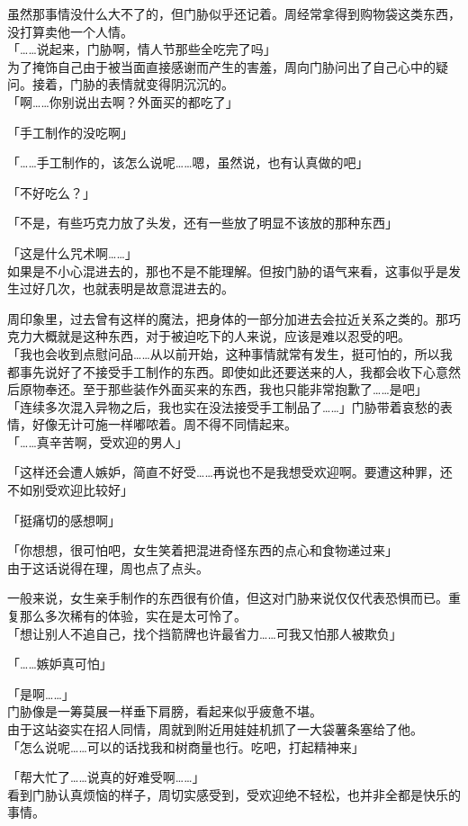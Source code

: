 虽然那事情没什么大不了的，但门胁似乎还记着。周经常拿得到购物袋这类东西，没打算卖他一个人情。\\

「……说起来，门胁啊，情人节那些全吃完了吗」\\

为了掩饰自己由于被当面直接感谢而产生的害羞，周向门胁问出了自己心中的疑问。接着，门胁的表情就变得阴沉沉的。\\

「啊……你别说出去啊？外面买的都吃了」

「手工制作的没吃啊」

「……手工制作的，该怎么说呢……嗯，虽然说，也有认真做的吧」

「不好吃么？」

「不是，有些巧克力放了头发，还有一些放了明显不该放的那种东西」

「这是什么咒术啊……」\\

如果是不小心混进去的，那也不是不能理解。但按门胁的语气来看，这事似乎是发生过好几次，也就表明是故意混进去的。

周印象里，过去曾有这样的魔法，把身体的一部分加进去会拉近关系之类的。那巧克力大概就是这种东西，对于被迫吃下的人来说，应该是难以忍受的吧。\\

「我也会收到点慰问品……从以前开始，这种事情就常有发生，挺可怕的，所以我都事先说好了不接受手工制作的东西。即使如此还要送来的人，我都会收下心意然后原物奉还。至于那些装作外面买来的东西，我也只能非常抱歉了……是吧」\\

「连续多次混入异物之后，我也实在没法接受手工制品了……」门胁带着哀愁的表情，好像无计可施一样嘟哝着。周不得不同情起来。\\

「……真辛苦啊，受欢迎的男人」

「这样还会遭人嫉妒，简直不好受……再说也不是我想受欢迎啊。要遭这种罪，还不如别受欢迎比较好」

「挺痛切的感想啊」

「你想想，很可怕吧，女生笑着把混进奇怪东西的点心和食物递过来」\\

由于这话说得在理，周也点了点头。

一般来说，女生亲手制作的东西很有价值，但这对门胁来说仅仅代表恐惧而已。重复那么多次稀有的体验，实在是太可怜了。\\

「想让别人不追自己，找个挡箭牌也许最省力……可我又怕那人被欺负」

「……嫉妒真可怕」

「是啊……」\\

门胁像是一筹莫展一样垂下肩膀，看起来似乎疲惫不堪。\\

由于这站姿实在招人同情，周就到附近用娃娃机抓了一大袋薯条塞给了他。\\%

「怎么说呢……可以的话找我和树商量也行。吃吧，打起精神来」

「帮大忙了……说真的好难受啊……」\\

看到门胁认真烦恼的样子，周切实感受到，受欢迎绝不轻松，也并非全都是快乐的事情。
